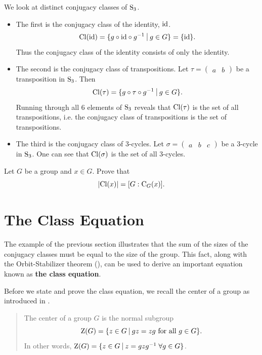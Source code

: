 \begin{example}\label{example-conjugacy-classes-of-Sn3}
    We look at distinct conjugacy classes of $\mathrm{S}_{3}$.
    \begin{itemize}
        \item The first is the conjugacy class of the identity, $\mathrm{id}$.
        \[
            \Cl{\id} = \{g\circ\id\circ g^{-1} \vert g \in G \} = \{\id\}.
        \]
        Thus the conjugacy class of the identity consists of only the identity.
        \item The second is the conjugacy class of transpositions. Let $\tau = \begin{pmatrix}a & b\end{pmatrix}$ be a transposition in $\mathrm{S}_{3}$. Then
        \[
            \Cl{\tau} = \{g\circ\tau\circ g^{-1} \vert g \in G\}.
        \]
        Running through all 6 elements of $\mathrm{S}_{3}$ reveals that $\mathrm{Cl}(\tau)$ is the set of all transpositions, i.e. the conjugacy class of transpositions is the set of transpositions.
        \item The third is the conjugacy class of 3-cycles. Let $\sigma = \begin{pmatrix}a & b & c\end{pmatrix}$ be a 3-cycle in $\mathrm{S}_{3}$. One can see that $\mathrm{Cl}(\sigma)$ is the set of all 3-cycles.
    \end{itemize}
\end{example}

\begin{exercise}\label{exercise-order-of-conjugacy-class}
    Let $G$ be a group and $x \in G$. Prove that
    \[
        |\mathrm{Cl}(x)| = [G : \mathrm{C}_{G}(x)].
    \]
\end{exercise}

\section{The Class Equation}
The example of the previous section illustrates that the sum of the sizes of the conjugacy classes must be equal to the size of the group. This fact, along with the Orbit-Stabilizer theorem (), can be used to derive an important equation known as \textbf{the class equation}.

Before we state and prove the class equation, we recall the center of a group as introduced in .
\begin{quote}
    The center of a group $G$ is the normal subgroup
    \[
        \Z{G} = \{z \in G \vert gz = zg \text{ for all } g \in G\}.
    \]
    In other words, $\Z{G} = \{z \in G \vert z = gzg^{-1} \; \forall g \in G\}$.
\end{quote}

